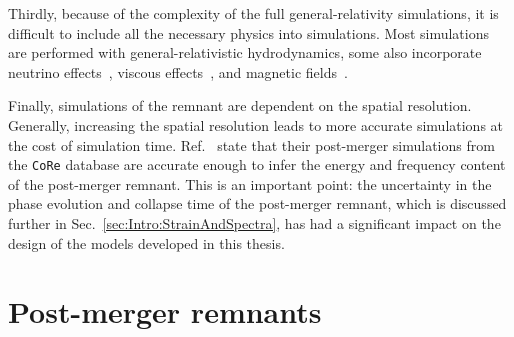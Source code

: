 \documentclass[../Thesis.tex]{subfiles}
\begin{document}
    Thirdly, because of the complexity of the full general-relativity simulations, it is difficult to include all the necessary physics into simulations.
    Most simulations are performed with general-relativistic hydrodynamics, some also incorporate neutrino effects~\cite[e.g.,][]{Sekiguchi2011,Perego2014,Foucart2016,Radice2016a,Zappa2018}, viscous effects~\cite[e.g.,][]{Shapiro2000,Duez2004, Radice2017,Shibata2017}, and magnetic fields~\cite[e.g.,][]{Duez2006,Duez2006a,Siegel2013,Siegel2014,Giacomazzo2011,Kiuchia2012,Giacomazzo2013,Kiuchi2014,Giacomazzo2015}. \par

    Finally, simulations of the remnant are dependent on the spatial resolution.
    Generally, increasing the spatial resolution leads to more accurate simulations at the cost of simulation time.
    Ref.~\cite{Dietrich2018} state that their post-merger simulations from  the \texttt{CoRe} database are accurate enough to infer the energy and frequency content of the post-merger remnant.
    This is an important point: the uncertainty in the phase evolution  and collapse time of the post-merger remnant, which is discussed further in Sec.~\ref{sec:Intro:StrainAndSpectra}, has had a significant impact on the design of the models developed in this thesis.



    \section{Post-merger remnants} \label{sec:Intro:PMR}
\end{document}
